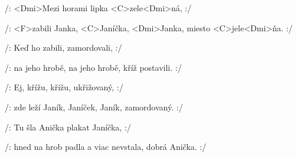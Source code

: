 

\zs
/: <Dmi>Mezi horami
lipka <C>zele<Dmi>ná, :/

/: <F>zabili Janka,
<C>Janíčka, <Dmi>Janka,
miesto <C>jele<Dmi>ňa. :/
\ks

\zs
/: Keď ho zabili,
zamordovali, :/

/: na jeho hrobě,
na jeho hrobě,
kříž postavili. :/
\ks

\zs
/: Ej, křížu, křížu,
ukřižovaný, :/

/: zde leží Janík,
Janíček, Janík,
zamordovaný. :/
\ks

\zs
/: Tu šla Anička
plakat Janíčka, :/

/: hned na hrob padla
a viac nevstala,
dobrá Anička. :/
\ks

\kp







